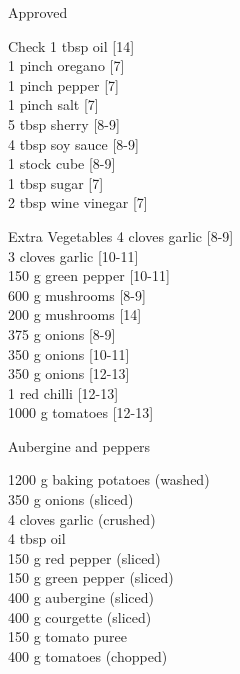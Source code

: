 \begin{menu}{Approved}
\begin{shoppinglist}{Check}
      1 tbsp oil 
        {\scriptsize[14]}\\
      1 pinch oregano 
        {\scriptsize[7]}\\
      1 pinch pepper 
        {\scriptsize[7]}\\
      1 pinch salt 
        {\scriptsize[7]}\\
      5 tbsp sherry 
        {\scriptsize[8-9]}\\
      4 tbsp soy sauce 
        {\scriptsize[8-9]}\\
      1  stock cube 
        {\scriptsize[8-9]}\\
      1 tbsp sugar 
        {\scriptsize[7]}\\
      2 tbsp wine vinegar 
        {\scriptsize[7]}\\
      \end{shoppinglist}%
      \begin{shoppinglist}{Extra Vegetables}
      4 cloves garlic 
        {\scriptsize[8-9]}\\
      3 cloves garlic 
        {\scriptsize[10-11]}\\
      150 g green pepper 
        {\scriptsize[10-11]}\\
      600 g mushrooms 
        {\scriptsize[8-9]}\\
      200 g mushrooms 
        {\scriptsize[14]}\\
      375 g onions 
        {\scriptsize[8-9]}\\
      350 g onions 
        {\scriptsize[10-11]}\\
      350 g onions 
        {\scriptsize[12-13]}\\
      1  red chilli 
        {\scriptsize[12-13]}\\
      1000 g tomatoes 
        {\scriptsize[12-13]}\\
      \end{shoppinglist}%
      \par\vfil %
    \vfil\clearpage
  
    \begin{recipe}{2}{Aubergine and peppers}%
    
		\begin{ingredients}
		1200 g baking potatoes (washed) \\
	350 g onions (sliced) \\
	4 cloves garlic (crushed) \\
	4 tbsp oil  \\
	150 g red pepper (sliced) \\
	150 g green pepper (sliced) \\
	400 g aubergine (sliced) \\
	400 g courgette (sliced) \\
	150 g tomato puree  \\
	400 g tomatoes (chopped) \\
	

\end{ingredients}
\end{recipe}
\end{menu}
